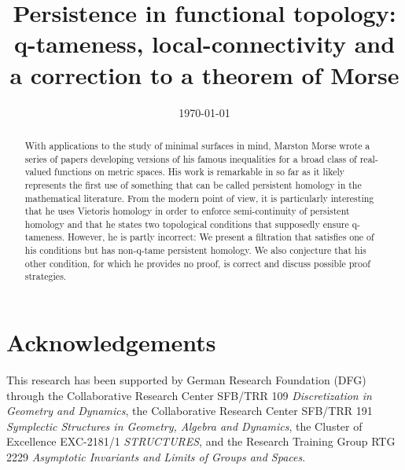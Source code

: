 \documentclass{amsart}
\theoremstyle{plain}
\theoremstyle{definition}
\begin{document}
\title{Persistence in functional topology: q-tameness, local-connectivity and a correction to a theorem of Morse}
\author{}
\date{\today}

\begin{abstract}
With applications to the study of minimal surfaces in mind, Marston Morse wrote a series of papers developing versions of his famous inequalities for a broad class of real-valued functions on metric spaces. His work is remarkable in so far as it likely represents the first use of something that can be called persistent homology in the mathematical literature. From the modern point of view, it is particularly interesting that he uses Vietoris homology in order to enforce semi-continuity of persistent homology and that he states two topological conditions that supposedly ensure q-tameness. However, he is partly incorrect: We present a filtration that satisfies one of his conditions but has non-q-tame persistent homology. We also conjecture that his other condition, for which he provides no proof, is correct and discuss possible proof strategies.
\end{abstract}

\maketitle







%

\section*{Acknowledgements}
This research has been supported by German Research Foundation (DFG) through the Collaborative Research Center SFB/TRR 109 \emph{Discretization in Geometry and Dynamics}, the Collaborative Research Center SFB/TRR 191 \emph{Symplectic Structures in Geometry, Algebra and Dynamics}, the Cluster of Excellence EXC-2181/1 \emph{STRUCTURES}, and the Research Training Group RTG 2229 \emph{Asymptotic Invariants and Limits of Groups and Spaces}.




\todos
\end{document}
